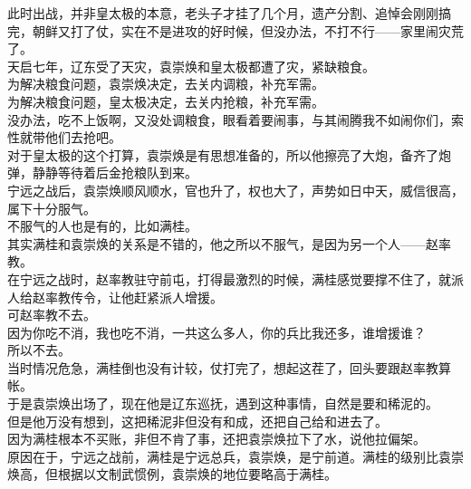 \begin{multicols}{\theparacolNo}
此时出战，并非皇太极的本意，老头子才挂了几个月，遗产分割、追悼会刚刚搞完，朝鲜又打了仗，实在不是进攻的好时候，但没办法，不打不行——家里闹灾荒了。\\

天启七年，辽东受了天灾，袁崇焕和皇太极都遭了灾，紧缺粮食。\\

为解决粮食问题，袁崇焕决定，去关内调粮，补充军需。\\

为解决粮食问题，皇太极决定，去关内抢粮，补充军需。\\

没办法，吃不上饭啊，又没处调粮食，眼看着要闹事，与其闹腾我不如闹你们，索性就带他们去抢吧。\\

对于皇太极的这个打算，袁崇焕是有思想准备的，所以他擦亮了大炮，备齐了炮弹，静静等待着后金抢粮队到来。\\

宁远之战后，袁崇焕顺风顺水，官也升了，权也大了，声势如日中天，威信很高，属下十分服气。\\

不服气的人也是有的，比如满桂。\\

其实满桂和袁崇焕的关系是不错的，他之所以不服气，是因为另一个人——赵率教。\\

在宁远之战时，赵率教驻守前屯，打得最激烈的时候，满桂感觉要撑不住了，就派人给赵率教传令，让他赶紧派人增援。\\

可赵率教不去。\\

因为你吃不消，我也吃不消，一共这么多人，你的兵比我还多，谁增援谁？\\

所以不去。\\

当时情况危急，满桂倒也没有计较，仗打完了，想起这茬了，回头要跟赵率教算帐。\\

于是袁崇焕出场了，现在他是辽东巡抚，遇到这种事情，自然是要和稀泥的。\\

但是他万没有想到，这把稀泥非但没有和成，还把自己给和进去了。\\

因为满桂根本不买账，非但不肯了事，还把袁崇焕拉下了水，说他拉偏架。\\

原因在于，宁远之战前，满桂是宁远总兵，袁崇焕，是宁前道。满桂的级别比袁崇焕高，但根据以文制武惯例，袁崇焕的地位要略高于满桂。\\


\end{multicols}

